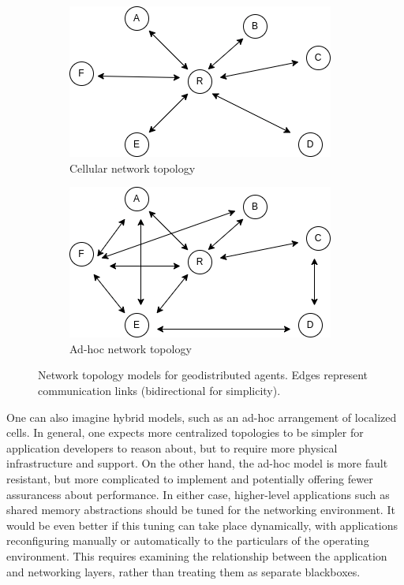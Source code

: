 \documentclass[]             %
{NASA}                       %
\theoremstyle{definition}
\begin{document}
\begin{figure}
     \centering
     \begin{subfigure}[b]{0.48\textwidth}
         \centering
         \includegraphics[width=\textwidth]{images/Centralized.png}
         \caption{Cellular network topology}
         \label{fig:centralized}
     \end{subfigure}
     \hfill
     \begin{subfigure}[b]{0.48\textwidth}
         \centering
         \includegraphics[width=\textwidth]{images/Decentralized.png}
         \caption{Ad-hoc network topology}
         \label{fig:decentralized}
     \end{subfigure}
        \caption{Network topology models for geodistributed agents. Edges represent communication links (bidirectional for simplicity).}
        \label{fig:nettopology}
\end{figure}

One can also imagine hybrid models, such as an ad-hoc arrangement of
localized cells. In general, one expects more centralized topologies to
be simpler for application developers to reason about, but to require
more physical infrastructure and support. On the other hand, the ad-hoc
model is more fault resistant, but more complicated to implement and
potentially offering fewer assurancess about performance. In either
case, higher-level applications such as shared memory abstractions
should be tuned for the networking environment. It would be even better
if this tuning can take place dynamically, with applications
reconfiguring manually or automatically to the particulars of the
operating environment. This requires examining the relationship between
the application and networking layers, rather than treating them as
separate blackboxes.
\end{document}
